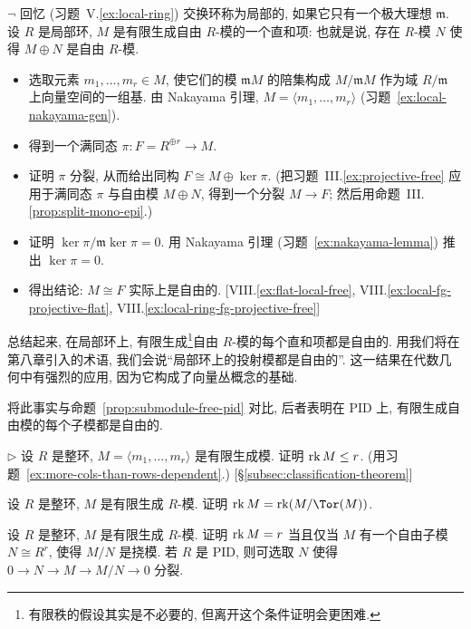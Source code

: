 \begin{prob}\label{ex:local-direct-summand}
$\neg$ 回忆 (习题~V.\ref{ex:local-ring}) 交换环称为局部的, 如果它只有一个极大理想 $\mathfrak{m}$. 设 $R$ 是局部环, $M$ 是有限生成自由 $R$-模的一个直和项: 也就是说, 存在 $R$-模 $N$ 使得 $M\oplus N$ 是自由 $R$-模.
\begin{itemize}
\item 选取元素 $m_1,\ldots,m_r\in M$, 使它们的模 $\mathfrak{m}M$ 的陪集构成 $M/\mathfrak{m}M$ 作为域 $R/\mathfrak{m}$ 上向量空间的一组基. 由 Nakayama 引理, $M=\langle m_1,\ldots,m_r\rangle$ (习题~\ref{ex:local-nakayama-gen}).
\item 得到一个满同态 $\pi:F=R^{\oplus r}\to M$.
\item 证明 $\pi$ 分裂, 从而给出同构 $F\cong M\oplus\ker\pi$. (把习题~III.\ref{ex:projective-free} 应用于满同态 $\pi$ 与自由模 $M\oplus N$, 得到一个分裂 $M\to F$; 然后用命题~III.\ref{prop:split-mono-epi}.)
\item 证明 $\ker\pi/\mathfrak{m}\ker\pi=0$. 用 Nakayama 引理 (习题~\ref{ex:nakayama-lemma}) 推出 $\ker\pi=0$.
\item 得出结论: $M\cong F$ 实际上是自由的. [VIII.\ref{ex:flat-local-free}, VIII.\ref{ex:local-fg-projective-flat}, VIII.\ref{ex:local-ring-fg-projective-free}]
\end{itemize}
总结起来, 在局部环上, 有限生成\footnote{有限秩的假设其实是不必要的, 但离开这个条件证明会更困难.}自由 $R$-模的每个直和项都是自由的. 用我们将在第八章引入的术语, 我们会说``局部环上的投射模都是自由的''. 这一结果在代数几何中有强烈的应用, 因为它构成了向量丛概念的基础.

将此事实与命题~\ref{prop:submodule-free-pid} 对比, 后者表明在 PID 上, 有限生成自由模的每个子模都是自由的.
\end{prob}

\begin{prob}\label{ex:rk-leq-generators}
$\triangleright$ 设 $R$ 是整环, $M=\langle m_1,\ldots,m_r\rangle$ 是有限生成模. 证明 $\operatorname{rk} M\le r$. (用习题~\ref{ex:more-cols-than-rows-dependent}.) [§\ref{subsec:classification-theorem}]
\end{prob}

\begin{prob}\label{ex:rk-quotient-tor}
设 $R$ 是整环, $M$ 是有限生成 $R$-模. 证明 $\rk M=\rk(M/\Tor(M))$.
\end{prob}

\begin{prob}\label{ex:rk-free-submodule}
设 $R$ 是整环, $M$ 是有限生成 $R$-模. 证明 $\operatorname{rk} M=r$ 当且仅当 $M$ 有一个自由子模 $N\cong R^r$, 使得 $M/N$ 是挠模. 若 $R$ 是 PID, 则可选取 $N$ 使得 $0\to N\to M\to M/N\to 0$ 分裂.
\end{prob}

